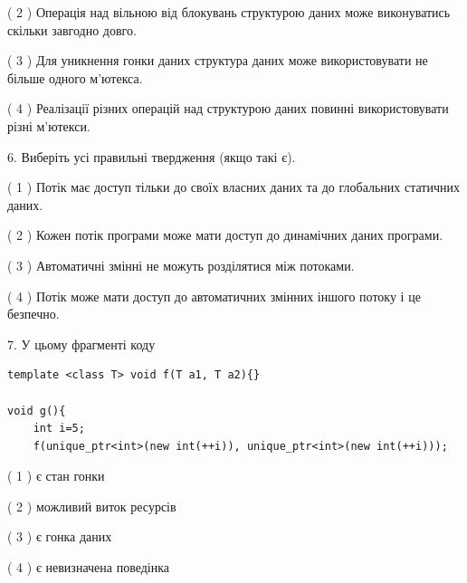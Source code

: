 \documentclass[12pt, ukrainian]{article}
\begin{document}
\begin {large}
{( 2 ) Операція над вільною від блокувань структурою даних може виконуватись скільки завгодно довго.%

( 3 ) Для уникнення гонки даних структура даних може використовувати не більше одного м’ютекса.%

( 4 ) Реалізації різних операцій над структурою даних повинні використовувати різні м’ютекси.%
\newpage



\vspace{5mm}
6. Виберіть усі правильні твердження (якщо такі є).\par
\vspace{2mm}

( 1 ) Потік має доступ тільки до своїх власних даних та до глобальних статичних даних.%

( 2 ) Кожен потік програми може мати доступ до динамічних даних програми.%

( 3 ) Автоматичні змінні не можуть розділятися між потоками.%

( 4 ) Потік може мати доступ до автоматичних змінних іншого потоку і це безпечно.%


\vspace{5mm}
7. У цьому фрагменті коду
\begin{verbatim}
template <class T> void f(T a1, T a2){}

void g(){
    int i=5;
    f(unique_ptr<int>(new int(++i)), unique_ptr<int>(new int(++i)));
\end{verbatim}

( 1 ) є стан гонки%

( 2 ) можливий виток ресурсів%

( 3 ) є гонка даних%

( 4 ) є невизначена поведінка%
}
\end {large}
\end{document}
